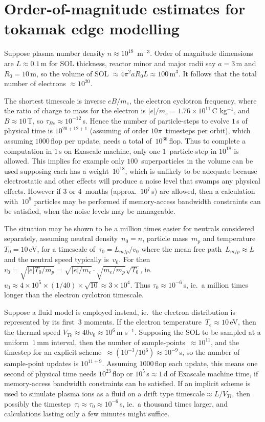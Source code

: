 \section{Order-of-magnitude estimates for tokamak edge modelling} \label{sec:cg}
Suppose plasma number density $n \approx 10^{18}$\, m$^{-3}$. Order of magnitude
dimensions are $L\approx0.1$\,m for SOL thickness, reactor minor and major radii
say $a=3$\,m and $R_0=10$\,m, so the volume of SOL $\approx 4 \pi^2 a R_0 L \approx 100$\,m$^3$.
It follows that the total number of electrons $\approx 10^{20}$.

The shortest timescale is inverse $e B/m_e$, the electron cyclotron frequency, where the
ratio of charge to mass for the electron is
$|e|/m_e = 1.76 \times 10^{11}$\,C kg$^{-1}$, and $B\approx 10$\,T, so $\tau_{Be}\approx 10^{-12}$\,s.
Hence the number of particle-steps to evolve $1$\,s of physical time is  $10^{20+12+1}$
(assuming of order $10\pi$~timesteps per orbit),
which assuming $1000$\,flop per update, needs a total of~$10^{36}$\,flop.
Thus to complete a computation in $1$\,s on Exascale machine, only one
$1$~particle-step in $10^{18}$ is allowed.
This implies for example only $100$~superparticles in the volume can be used supposing
each has a weight~$10^{18}$, which
is unlikely to be adequate because electrostatic and other effects will produce a noise level
that swamps any physical effects. However if $3$ or $4$~months (approx.~$10^7$\,s) are allowed, then
a calculation with~$10^9$ particles may be performed if memory-access bandwidth constraints
can be satisfied, when the noise levels may be manageable.

The situation may be shown to be a million times easier for neutrals considered
separately, assuming neutral density~$n_0=n$, particle mass~$m_p$ and temperature~$T_0=10$\,eV, for a
timescale of~$\tau_{0}=L_{mfp}/v_0$ where the mean free path~$L_{mfp}\approx L$ and the neutral
speed typically is~$v_0$. For then $v_0=\sqrt{|e|T_0/m_p}
=\sqrt{|e|/m_e} \cdot \sqrt{m_e/m_p} \sqrt{T_0}$, ie.\ 
$v_{0}\approx 4 \times 10^5 \times (1/40) \times \sqrt{10}\approx 3 \times 10^4$. Thus
$\tau_0\approx 10^{-6}$\,s, ie.\  a million times longer than the electron cyclotron timescale.

Suppose a fluid model is employed instead, ie.\ the electron distribution is
represented by its first~$3$ moments.
If the electron temperature~$T_e \approx 10$\,eV, then the
thermal speed $V_{Te}\approx 40 v_0 \approx 10^6$\,m s$^{-1}$. Supposing the SOL to be sampled at a
uniform~$1$\,mm interval, then the
number of sample-points~$\approx 10^{11}$, and the timestep for an explicit scheme~$\approx (10^{-3} /10^6)\approx 10^{-9}$\,s,
so the number of sample-point updates is $10^{11+9}$. Assuming  $1000$\,flop each update, this
means one second of physical time needs $10^{23}$\,flop or $10^5$\,s$\approx 1$\,d
of Exascale machine time, if memory-access bandwidth constraints can be satisfied. If an implicit scheme
is used to simulate plasma ions as a fluid on a drift type timescale$\approx L/V_{Ti}$, then
possibly the timestep~$\tau_i\approx \tau_0\approx 10^{-6}$\,s, ie.\ a thousand times larger, and
calculations lasting only a few minutes might suffice.

